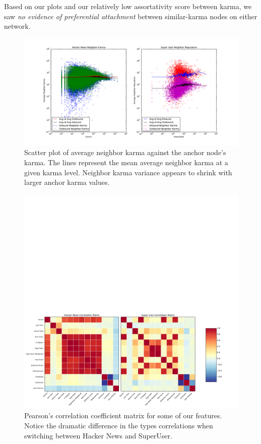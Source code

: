 \documentclass[11pt]{article}
\begin{document}
Based on our plots and our relatively low assortativity score between karma, we
saw \textit{no evidence of preferential attachment} between similar-karma nodes
on either network.

\begin{figure}[t]
\centering
\includegraphics[width=\linewidth]{karma_cliques}
\caption{Scatter plot of average neighbor karma against the anchor node's karma. 
The lines represent the mean average neighbor karma at a given karma level.
Neighbor karma variance appears to shrink with larger anchor karma values.}
\label{fig:karma_cliques}
\end{figure}

\begin{figure}[t]
\centering
\includegraphics[width=0.9\linewidth]{correlation}
\caption{Pearson's correlation coefficient matrix for some of our features.
Notice the dramatic difference in the types correlations when switching
between Hacker News and SuperUser.}
\label{fig:correlation}
\end{figure}
\end{document}
